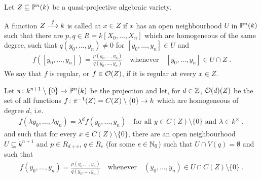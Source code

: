 \documentclass[a4paper,parskip=half,numbers=enddot, DIV=12, headheight=30pt]{scrreprt}
\begin{document}
\begin{defi}
    Let $Z\subseteq\mathbb{P}^n(k)$ be a quasi-projective algebraic variety. 
    \begin{alphanumerate}
    	\item A function $Z\morphism[f] k$ is called  at $x\in Z$ if $x$ has an open neighbourhood $U$ in $\mathbb{P}^n(k)$ such that there are $p,q\in R = k[X_0,\ldots,X_n]$ which are homogeneous of the same degree, such that $q(y_0,\ldots,y_n) \neq 0$ for $[y_0,\ldots,y_n]\in U$ and
    	\begin{align*}
	    	f([y_0,\ldots,y_n]) = \frac{p(y_0,\ldots,y_n)}{q(y_0,\ldots,y_n)}\quad\text{whenever}\quad[y_0,\ldots, y_n]\in U\cap Z\;.
    	\end{align*}
    	We say that $f$ is regular, or $f\in \mathcal{O}(Z)$, if it is regular at every $x\in Z$.
    	\item  Let $\pi\colon k^{n+1}\setminus \{0\} \morphism \IP^n(k)$ be the projection and let, for $d\in \mathbb{Z}$, $\mathcal{O}(d)(Z)$ be the set of all functions $f\colon \pi^{-1}(Z) = C(Z)\setminus\{0\}\morphism k$ which are homogeneous of degree $d$, i.e.
    	\begin{align*}
	    	f(\lambda y_0,\ldots, \lambda y_n) = \lambda^d f(y_0,\ldots, y_n)\quad \text{for all }y\in C(Z)\setminus\{0\}\text{ and }\lambda \in k^\times\;, 
    	\end{align*}
    	and such that for every $x\in C(Z)\setminus\{0\}$, there are an open neighbourhood $U\subseteq k^{n+1}$ and $p\in R_{d+e}$, $q\in R_e$ (for some $e\in \mathbb{N}_0$) such that $U\cap V(q) = \emptyset$ and such that 
    	\begin{align*}
	    	f(y_0,\ldots, y_n) = \frac{p(y_0,\ldots, y_n)}{q(y_0,\ldots, y_n)}\quad\text{whenever}\quad(y_0,\ldots, y_n)\in U\cap C(Z)\setminus\{0\}\;. 
    	\end{align*}
    \end{alphanumerate}
    
    
\end{defi}
\end{document}
